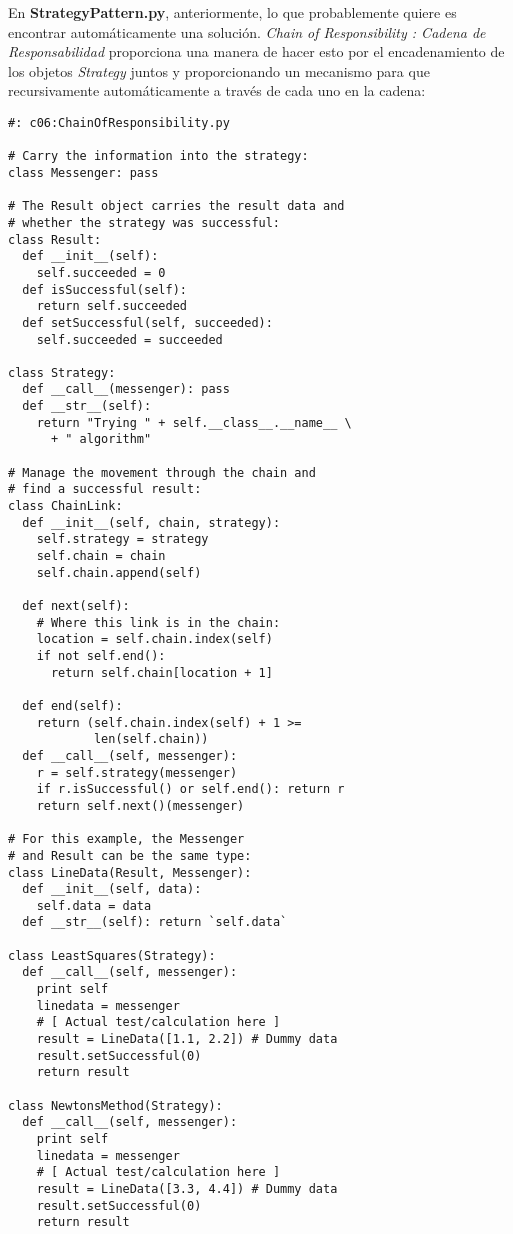 
En \textbf{StrategyPattern.py}, anteriormente, lo que probablemente quiere es encontrar automáticamente una solución. \textit{Chain of Responsibility : Cadena de Responsabilidad} proporciona una manera de hacer esto por el encadenamiento de los objetos \textit{Strategy} juntos y proporcionando un mecanismo para que recursivamente automáticamente a través de cada uno en la cadena:     \newline

\begin{lstlisting} 
#: c06:ChainOfResponsibility.py 

# Carry the information into the strategy: 
class Messenger: pass 

# The Result object carries the result data and 
# whether the strategy was successful: 
class Result: 
  def __init__(self): 
    self.succeeded = 0 
  def isSuccessful(self):  
    return self.succeeded  
  def setSuccessful(self, succeeded):  
    self.succeeded = succeeded 
    
class Strategy: 
  def __call__(messenger): pass 
  def __str__(self):  
    return "Trying " + self.__class__.__name__ \ 
      + " algorithm" 
      
# Manage the movement through the chain and 
# find a successful result: 
class ChainLink: 
  def __init__(self, chain, strategy): 
    self.strategy = strategy 
    self.chain = chain 
    self.chain.append(self) 
    
  def next(self): 
    # Where this link is in the chain: 
    location = self.chain.index(self) 
    if not self.end(): 
      return self.chain[location + 1] 
      
  def end(self): 
    return (self.chain.index(self) + 1 >=  
            len(self.chain)) 
  def __call__(self, messenger): 
    r = self.strategy(messenger) 
    if r.isSuccessful() or self.end(): return r 
    return self.next()(messenger) 
    
# For this example, the Messenger 
# and Result can be the same type: 
class LineData(Result, Messenger): 
  def __init__(self, data): 
    self.data = data 
  def __str__(self): return `self.data` 
  
class LeastSquares(Strategy):   
  def __call__(self, messenger): 
    print self 
    linedata = messenger 
    # [ Actual test/calculation here ] 
    result = LineData([1.1, 2.2]) # Dummy data 
    result.setSuccessful(0) 
    return result 
    
class NewtonsMethod(Strategy): 
  def __call__(self, messenger): 
    print self 
    linedata = messenger 
    # [ Actual test/calculation here ] 
    result = LineData([3.3, 4.4]) # Dummy data 
    result.setSuccessful(0) 
    return result 
    

\end{lstlisting}
